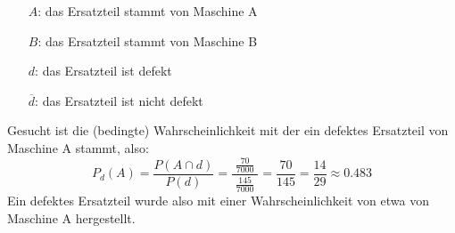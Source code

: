 \begin{exercise}
\begin{minipage}{0.4\linewidth}
\begin{fofotab}
      \end{fofotab}
    \end{minipage}%
    \begin{minipage}{0.53\linewidth}
      \begin{itemize}
        \renewcommand{\itemsep}{-1ex}%
        \item[$A$:] \glqq das Ersatzteil stammt von Maschine A\grqq
        \item[$B$:] \glqq das Ersatzteil stammt von Maschine B\grqq
        \item[$d$:] \glqq das Ersatzteil ist defekt\grqq
        \item[$\overline{d}$:] \glqq das Ersatzteil ist nicht defekt\grqq
      \end{itemize}
    \end{minipage}\par
    Gesucht ist die (bedingte) Wahrscheinlichkeit
    mit der ein defektes Ersatzteil von Maschine
    A stammt, also:
    \begin{equation*}
      P_{d}(A)=\frac{P(A\cap d)}{P(d)}
      =\frac{\;\frac{70}{\num{7000}}\;}{\;\frac{145}{\num{7000}}\;}
      =\frac{70}{145}
      =\frac{14}{29}
      \approx\num{0.483}
    \end{equation*}
    Ein defektes Ersatzteil wurde also mit
    einer Wahrscheinlichkeit von etwa 
    von Maschine A hergestellt.
  \fi
\end{exercise}
